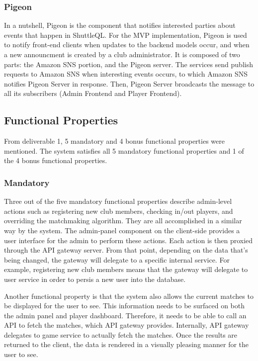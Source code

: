 \documentclass{article}
\begin{document}
\subsubsection{Pigeon}
In a nutshell, Pigeon is the component that notifies interested parties about events that happen in ShuttleQL. For the MVP implementation, Pigeon is used to notify front-end clients when updates to the backend models occur, and when a new announcment is created by a club administrator. It is composed of two parts: the Amazon SNS portion, and the Pigeon server. The services send publish requests to Amazon SNS when interesting events occurs, to which Amazon SNS notifies Pigeon Server in response. Then, Pigeon Server broadcasts the message to all its subscribers (Admin Frontend and Player Frontend).

\subsection{Functional Properties}
From deliverable 1, 5 mandatory and 4 bonus functional properties were mentioned. The system satisfies all 5 mandatory functional properties and 1 of the 4 bonus functional properties.

\subsubsection{Mandatory}
Three out of the five mandatory functional properties describe admin-level actions such as registering new club members, checking in/out players, and overriding the matchmaking algorithm. They are all accomplished in a similar way by the system. The admin-panel component on the client-side provides a user interface for the admin to perform these actions. Each action is then proxied through the API gateway server. From that point, depending on the data that's being changed, the gateway will delegate to a specific internal service. For example, registering new club members means that the gateway will delegate to user service in order to persis a new user into the database.

Another functional property is that the system also allows the current matches to be displayed for the user to see. This information needs to be surfaced on both the admin panel and player dashboard. Therefore, it needs to be able to call an API to fetch the matches, which API gateway provides. Internally, API gateway delegates to game service to actually fetch the matches. Once the results are returned to the client, the data is rendered in a visually pleasing manner for the user to see.
\end{document}
